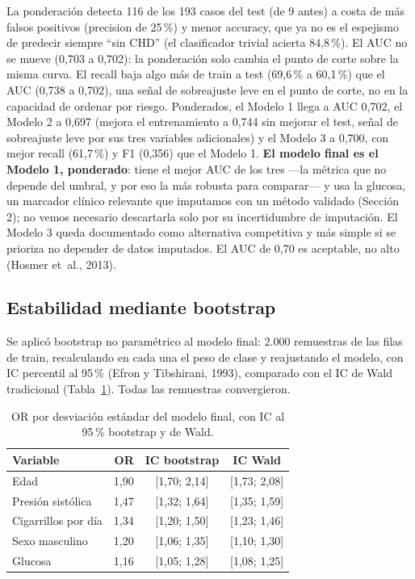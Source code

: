 \documentclass[11pt,a4paper]{article}
\begin{document}
La ponderación detecta 116 de los 193 casos del test (de 9 antes) a costa de más falsos positivos (precision de 25\,\%) y menor accuracy, que ya no es el espejismo de predecir siempre ``sin CHD'' (el clasificador trivial acierta 84,8\,\%). El AUC no se mueve (0,703 a 0,702): la ponderación solo cambia el punto de corte sobre la misma curva. El recall baja algo más de train a test (69,6\,\% a 60,1\,\%) que el AUC (0,738 a 0,702), una señal de sobreajuste leve en el punto de corte, no en la capacidad de ordenar por riesgo. Ponderados, el Modelo 1 llega a AUC 0,702, el Modelo 2 a 0,697 (mejora el entrenamiento a 0,744 sin mejorar el test, señal de sobreajuste leve por sus tres variables adicionales) y el Modelo 3 a 0,700, con mejor recall (61,7\,\%) y F1 (0,356) que el Modelo 1. \textbf{El modelo final es el Modelo 1, ponderado}: tiene el mejor AUC de los tres —la métrica que no depende del umbral, y por eso la más robusta para comparar— y usa la glucosa, un marcador clínico relevante que imputamos con un método validado (Sección 2); no vemos necesario descartarla solo por su incertidumbre de imputación. El Modelo 3 queda documentado como alternativa competitiva y más simple si se prioriza no depender de datos imputados. El AUC de 0,70 es aceptable, no alto (Hosmer et~al., 2013).

\subsection{Estabilidad mediante bootstrap}
Se aplicó bootstrap no paramétrico al modelo final: 2.000 remuestras de las filas de train, recalculando en cada una el peso de clase y reajustando el modelo, con IC percentil al 95\,\% (Efron y Tibshirani, 1993), comparado con el IC de Wald tradicional (Tabla~\ref{tab:boot}). Todas las remuestras convergieron.

\begin{table}[H]
\centering\small
\caption{OR por desviación estándar del modelo final, con IC al 95\,\% bootstrap y de Wald.}\label{tab:boot}
\begin{tabular}{@{}lrcc@{}}
\toprule
\textbf{Variable} & \textbf{OR} & \textbf{IC bootstrap} & \textbf{IC Wald} \\
\midrule
Edad                 & 1,90 & [1,70; 2,14] & [1,73; 2,08] \\
Presión sistólica    & 1,47 & [1,32; 1,64] & [1,35; 1,59] \\
Cigarrillos por día  & 1,34 & [1,20; 1,50] & [1,23; 1,46] \\
Sexo masculino       & 1,20 & [1,06; 1,35] & [1,10; 1,30] \\
Glucosa              & 1,16 & [1,05; 1,28] & [1,08; 1,25] \\
\bottomrule
\end{tabular}
\end{table}
\end{document}

